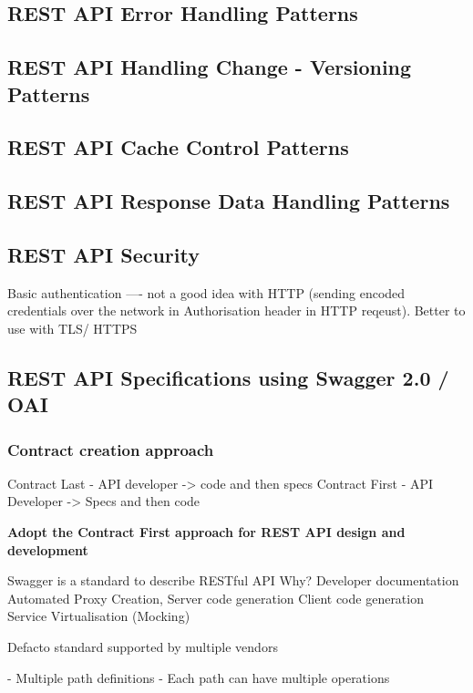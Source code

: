 \documentclass[a4paper, 11pt]{book}
\begin{document}
    \subsection{REST API Error Handling Patterns}

    \subsection{REST API Handling Change - Versioning Patterns}

    \subsection{REST API Cache Control Patterns}

    \subsection{REST API Response Data Handling Patterns}

    \subsection{REST API Security}

    Basic authentication ---- not a good idea with HTTP (sending encoded credentials over the network in Authorisation header in HTTP reqeust). Better to use with TLS/ HTTPS

    \subsection{REST API Specifications using Swagger 2.0 / OAI}

    \subsubsection{Contract creation approach}
    Contract Last - API developer -> code and then specs
    Contract First - API Developer -> Specs and then code

    \textbf{Adopt the Contract First approach for REST API design and development}

    Swagger is a standard to describe RESTful API
    Why?
    Developer documentation
    Automated Proxy Creation, Server code generation
    Client code generation
    Service Virtualisation (Mocking)

    Defacto standard supported by multiple vendors

    - Multiple path definitions
    - Each path can have multiple operations
\end{document}
